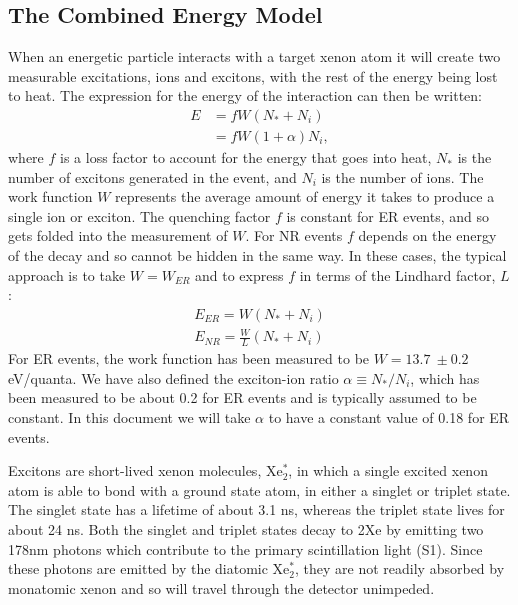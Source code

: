 \subsection{The Combined Energy Model}\label{sec:combE}
When an energetic particle interacts with a target xenon atom it will create two measurable excitations, ions and excitons, with the rest of the energy being lost to heat. The expression for the energy of the interaction can then be written:
\begin{equation}\label{eq:combe1}
\begin{split}
E&=fW(N_*+N_i)\\
&=fW(1+\alpha)N_i,
\end{split}
\end{equation}
where $f$ is a loss factor to account for the energy that goes into heat, $N_*$ is the number of excitons generated in the event, and $N_i$ is the number of ions. The work function $W$ represents the average amount of energy it takes to produce a single ion or exciton. The quenching factor $f$ is constant for ER events, and so gets folded into the measurement of $W$. For NR events $f$ depends on the energy of the decay and so cannot be hidden in the same way. In these cases, the typical approach is to take $W=W_{ER}$ and to express $f$ in terms of the Lindhard factor, $L$\cite{lindhard}:
\begin{equation}
\begin{split}
E_{ER}=W(N_*+N_i)\\[1em]
E_{NR}=\frac{W}{L}(N_*+N_i)
\end{split}
\end{equation}
For ER events, the work function has been measured to be $W=13.7 \ \pm0.2$ eV/quanta\cite{dahl}. We have also defined the exciton-ion ratio $\alpha \equiv N_{*}/N_{i}$, which has been measured to be about 0.2\cite{doke2002,attila} for ER events and is typically assumed to be constant. In this document we will take $\alpha$ to have a constant value of 0.18 for ER events. 

Excitons are short-lived xenon molecules, Xe$_2^*$, in which a single excited xenon atom is able to bond with a ground state atom, in either a singlet or triplet state. The singlet state has a lifetime of about 3.1 ns, whereas the triplet state lives for about 24 ns\cite{pulseshape}. Both the singlet and triplet states decay to 2Xe by emitting two 178nm photons which contribute to the primary scintillation light (S1). Since these photons are emitted by the diatomic Xe$_2^*$, they are not readily absorbed by monatomic xenon and so will travel through the detector unimpeded. 

